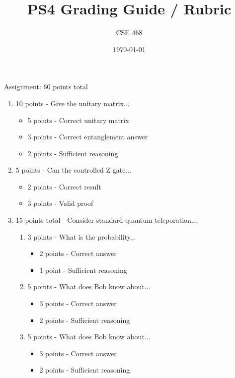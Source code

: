 \documentclass[12pt]{article}
\title{PS4 Grading Guide / Rubric}
\author{CSE 468}
\date{\today}
\begin{document}
\maketitle

Assignment: 60 points total
\begin{enumerate}[font=\bfseries]
    \item 10 points - Give the unitary matrix...
        \begin{itemize}
            \item 5 points - Correct unitary matrix
            \item 3 points - Correct entanglement answer
            \item 2 points - Sufficient reasoning
        \end{itemize}
    \item 5 points - Can the controlled Z gate...
        \begin{itemize}
            \item 2 points - Correct result
            \item 3 points - Valid proof
        \end{itemize}
    \item 15 points total - Consider standard quantum teleporation...
        \begin{enumerate}
            \item 3 points - What is the probability...
            \begin{itemize}
                \item 2 points - Correct answer
                \item 1 point - Sufficient reasoning
            \end{itemize}
            \item 5 points - What does Bob know about...
            \begin{itemize}
                \item 3 points - Correct answer
                \item 2 points - Sufficient reasoning
            \end{itemize}
            \item 5 points - What does Bob know about...
            \begin{itemize}
                \item 3 points - Correct answer
                \item 2 points - Sufficient reasoning
            \end{itemize}

\end{enumerate}
\end{enumerate}
\end{document}

